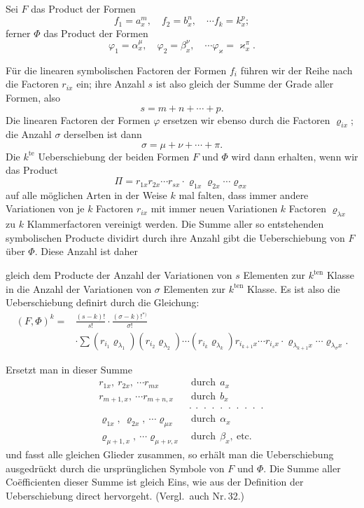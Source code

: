 \documentclass[11pt]{article}
\providecommand{\weberpage}[1]{}
\providecommand{\weq}[2]{\begin{equation}\tag{#1}#2\end{equation}}
\let\Pi\varPi
\let\Phi\varPhi
\begin{document}
Sei $F$ das Product der Formen
\[
f_1=a_x^m,\quad f_2=b_x^n,\quad\cdots f_k=k_x^p;
\]
ferner $\Phi$ das Product der Formen
\[
\varphi_1=\alpha_x^\mu,\quad \varphi_2=\beta_x^\nu,\quad\cdots \varphi_\varkappa=\varkappa_x^\pi.
\]

Für die linearen symbolischen Factoren der Formen $f_i$ führen wir der
Reihe nach die Factoren $r_{ix}$ ein; ihre Anzahl $s$ ist also gleich
der Summe der Grade aller Formen, also
\[
s=m+n+\cdots+p.
\]
Die linearen Factoren der Formen $\varphi$ ersetzen wir ebenso durch
die Factoren $\varrho_{ix}$; die Anzahl $\sigma$ derselben ist dann
\[
\sigma=\mu+\nu+\cdots+\pi.
\]
Die $k^{\text{te}}$ Ueberschiebung der beiden Formen $F$ und $\Phi$
wird dann erhalten, wenn wir das Product
\[
\Pi=r_{1x}r_{2x}\cdots r_{sx}\cdot\varrho_{1x}\varrho_{2x}\cdots\varrho_{\sigma x}
\]
auf alle möglichen Arten in der Weise $k$ mal falten, dass immer
andere Variationen von je $k$ Factoren $r_{ix}$ mit immer neuen
Variationen $k$ Factoren $\varrho_{\lambda x}$ zu $k$ Klammerfactoren
vereinigt werden. Die Summe aller so entstehenden symbolischen
Producte dividirt durch ihre Anzahl gibt die Ueberschiebung von $F$
über $\Phi$. Diese Anzahl ist daher


\weberpage{40}
gleich dem Producte der Anzahl der Variationen von $s$ Elementen zur
$k^{\text{ten}}$ Klasse in die Anzahl der Variationen von $\sigma$
Elementen zur $k^{\text{ten}}$ Klasse. Es ist also die Ueberschiebung
definirt durch die Gleichung:
\weq{I}{
\begin{aligned}
(F, \Phi)^k={}&\frac{(s-k)!}{s!}\cdot\frac{(\sigma-k)!^{*)}}{\sigma!}\\
&\cdot\sum(r_{i_1}\varrho_{\lambda_1})(r_{i_2}\varrho_{\lambda_2})\cdots(r_{i_k}\varrho_{\lambda_k})r_{i_{k+1}x}\cdots r_{i_sx}\cdot\varrho_{\lambda_{k+1}x}\cdots\varrho_{\lambda_\sigma x}.
\end{aligned}
}

Ersetzt man in dieser Summe
\[
\begin{aligned}
r_{1x},\ r_{2x},\ \cdots r_{mx} &\ \text{durch}\ \ a_x\\
r_{m+1,x},\ \cdots r_{m+n,x} &\ \text{durch}\ \ b_x\\
&\cdot\ \cdot\ \cdot\ \cdot\ \cdot\ \cdot\ \cdot\ \cdot\ \cdot\ \cdot\\
\varrho_{1x},\ \varrho_{2x},\ \cdots \varrho_{\mu x} &\ \text{durch}\ \ \alpha_x\\
\varrho_{\mu+1,x},\ \cdots \varrho_{\mu+\nu,x} &\ \text{durch}\ \ \beta_x,\ \text{etc.}
\end{aligned}
\]
und fasst alle gleichen Glieder zusammen, so erhält man die
Ueberschiebung ausgedrückt durch die ursprünglichen Symbole von $F$
und $\Phi$. Die Summe aller Co\"efficienten dieser Summe ist gleich
Eins, wie aus der Definition der Ueberschiebung direct hervorgeht.
(Vergl.\ auch Nr.\,32.)
\end{document}
